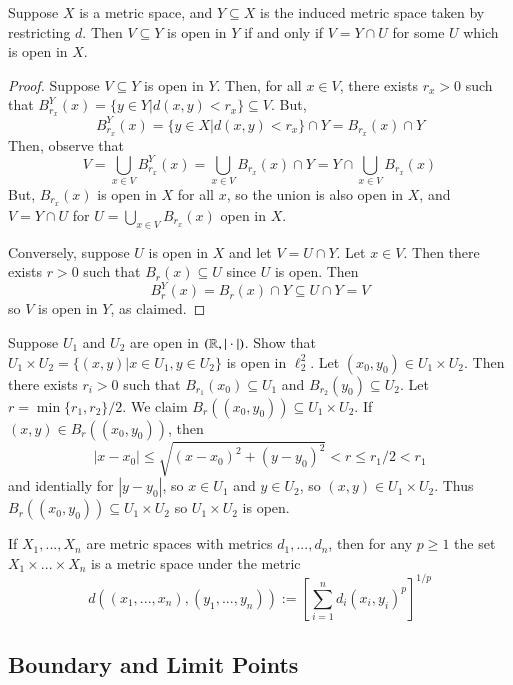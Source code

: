 \begin{proposition}
    Suppose $X$ is a metric space, and $Y \subseteq X$ is the induced metric space taken by restricting $d$. Then $V \subseteq Y$ is open in $Y$ if and only if $V = Y\cap U$ for some $U$ which is open in $X$.
\end{proposition}
\begin{proof}
    Suppose $V \subseteq Y$ is open in $Y$. Then, for all $x \in V$, there exists $r_x > 0$ such that $B_{r_x}^Y(x) = \{y \in Y\vert d(x,y) <r_x\} \subseteq V$. But, $$B_{r_x}^Y(x) = \{y \in X\vert d(x,y) <r_x\}\cap Y = B_{r_x}(x)\cap Y$$ Then, observe that $$V = \bigcup_{x \in V}B_{r_x}^Y(x) = \bigcup_{x \in V}B_{r_x}(x)\cap Y = Y\cap \bigcup_{x\in V}B_{r_x}(x)$$ But, $B_{r_x}(x)$ is open in $X$ for all $x$, so the union is also open in $X$, and $V = Y\cap U$ for $U = \bigcup_{x \in V}B_{r_x}(x)$ open in $X$.

    Conversely, suppose $U$ is open in $X$ and let $V = U\cap Y$. Let $x \in V$. Then there exists $r > 0$ such that $B_r(x) \subseteq U$ since $U$ is open. Then $$B_r^Y(x) = B_r(x)\cap Y \subseteq U\cap Y = V$$ so $V$ is open in $Y$, as claimed.
\end{proof}

\begin{example}
    Suppose $U_1$ and $U_2$ are open in $(\mathbb R,|\cdot |)$. Show that $U_1\times U_2 = \{(x,y)\vert x \in U_1,y \in U_2\}$ is open in $\ell_2^2$. Let $(x_0,y_0) \in U_1\times U_2$. Then there exists $r_i > 0$ such that $B_{r_1}(x_0) \subseteq U_1$ and $B_{r_2}(y_0) \subseteq U_2$. Let $r = \min\{r_1,r_2\}/2$. We claim $B_r((x_0,y_0)) \subseteq U_1\times U_2$. If $(x,y) \in B_r((x_0,y_0))$, then $$|x-x_0| \leq \sqrt{(x-x_0)^2+(y-y_0)^2} < r \leq r_1/2 < r_1$$ and identially for $|y-y_0|$, so $x \in U_1$ and $y \in U_2$, so $(x,y) \in U_1\times U_2$. Thus $B_r((x_0,y_0)) \subseteq U_1\times U_2$ so $U_1\times U_2$ is open.
\end{example}

If $X_1,...,X_n$ are metric spaces with metrics $d_1,...,d_n$, then for any $p\geq 1$ the set $X_1\times...\times X_n$ is a metric space under the metric $$d\left((x_1,...,x_n),(y_1,...,y_n)\right) :=\left[\sum_{i=1}^nd_i(x_i,y_i)^p\right]^{1/p}$$

\subsection{Boundary and Limit Points}


